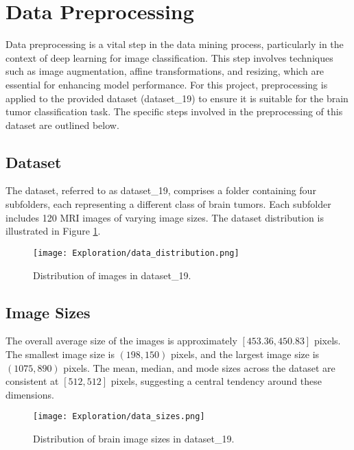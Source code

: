 \section{Data Preprocessing}\label{data_preprocessing}

Data preprocessing is a vital step in the data mining process, particularly in the context of deep learning for image classification. This step involves techniques such as image augmentation, affine transformations, and resizing, which are essential for enhancing model performance. For this project, preprocessing is applied to the provided dataset (dataset\_19) to ensure it is suitable for the brain tumor classification task. The specific steps involved in the preprocessing of this dataset are outlined below.

\subsection{Dataset}\label{dataset_given}

The dataset, referred to as dataset\_19, comprises a folder containing four subfolders, each representing a different class of brain tumors. Each subfolder includes 120 MRI images of varying image sizes. The dataset distribution is illustrated in Figure \ref{fig:data_distribution}.

\begin{figure}[H]
  \begin{center}
    \texttt{[image: Exploration/data\_distribution.png]}
  \end{center}
  \caption{Distribution of images in dataset\_19.}\label{fig:data_distribution}
\end{figure}

\subsection{Image Sizes}\label{image_sizes}
The overall average size of the images is approximately $[453.36, 450.83]$ pixels. The smallest image size is $(198, 150)$ pixels, and the largest image size is $(1075, 890)$ pixels. The mean, median, and mode sizes across the dataset are consistent at $[512, 512]$ pixels, suggesting a central tendency around these dimensions.


\begin{figure}[H]
  \begin{center}
    \texttt{[image: Exploration/data\_sizes.png]}
  \end{center}
  \caption{Distribution of brain image sizes in dataset\_19.}\label{fig:data_sizes}
\end{figure}

